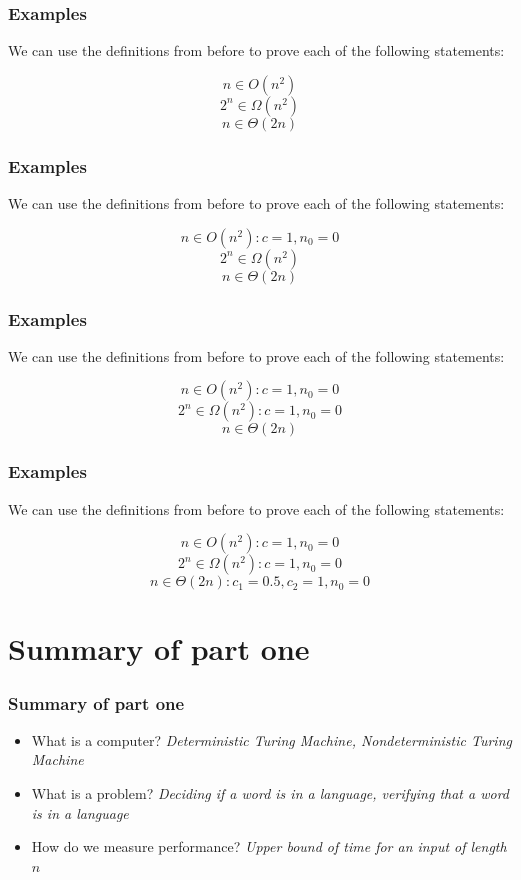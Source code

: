 \documentclass[aspectratio=169]{beamer}
\begin{document}
\begin{frame}
\frametitle{Examples}
We can use the definitions from before to prove each of the following statements:

$$n \in O(n^2)$$
$$2^n \in \Omega(n^2)$$
$$n \in \Theta(2n)$$
\end{frame}

\begin{frame}[noframenumbering]
\frametitle{Examples}
We can use the definitions from before to prove each of the following statements:

$$n \in O(n^2): c = 1, n_0 = 0$$
$$2^n \in \Omega(n^2)$$
$$n \in \Theta(2n)$$
\end{frame}

\begin{frame}[noframenumbering]
\frametitle{Examples}
We can use the definitions from before to prove each of the following statements:

$$n \in O(n^2): c = 1, n_0 = 0$$
$$2^n \in \Omega(n^2): c = 1, n_0 = 0$$
$$n \in \Theta(2n)$$
\end{frame}

\begin{frame}[noframenumbering]
\frametitle{Examples}
We can use the definitions from before to prove each of the following statements:

$$n \in O(n^2): c = 1, n_0 = 0$$
$$2^n \in \Omega(n^2): c = 1, n_0 = 0$$
$$n \in \Theta(2n): c_1 = 0.5, c_2 = 1, n_0 = 0$$
\end{frame}

\section{Summary of part one}

\begin{frame}
\frametitle{Summary of part one}
\begin{itemize}
    \item What is a computer? {\em Deterministic Turing Machine, Nondeterministic Turing Machine}
    \item What is a problem? {\em Deciding if a word is in a language, verifying that a word is in a language}
    \item How do we measure performance? {\em Upper bound of time for an input of length $n$}
\end{itemize}
\end{frame}
\end{document}
